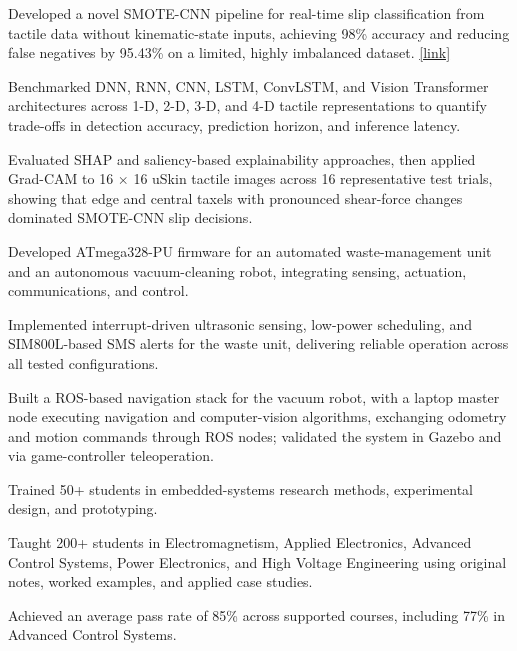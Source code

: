 \begin{details}
    \item Developed a novel SMOTE-CNN pipeline for real-time slip classification from tactile data without kinematic-state inputs, achieving 98\% accuracy and reducing false negatives by 95.43\% on a limited, highly imbalanced dataset. \href{https://github.com/nelsonifechukwu/NELSON_IML_WORK}{[link]}
    \item Benchmarked DNN, RNN, CNN, LSTM, ConvLSTM, and Vision Transformer architectures across 1-D, 2-D, 3-D, and 4-D tactile representations to quantify trade-offs in detection accuracy, prediction horizon, and inference latency.
    \item Evaluated SHAP and saliency-based explainability approaches, then applied Grad-CAM to 16 $\times$ 16 uSkin tactile images across 16 representative test trials, showing that edge and central taxels with pronounced shear-force changes dominated SMOTE-CNN slip decisions.
\end{details}

\begin{details}
    \item Developed ATmega328-PU firmware for an automated waste-management unit and an autonomous vacuum-cleaning robot, integrating sensing, actuation, communications, and control.
    \item Implemented interrupt-driven ultrasonic sensing, low-power scheduling, and SIM800L-based SMS alerts for the waste unit, delivering reliable operation across all tested configurations.
    \item Built a ROS-based navigation stack for the vacuum robot, with a laptop master node executing navigation and computer-vision algorithms, exchanging odometry and motion commands through ROS nodes; validated the system in Gazebo and via game-controller teleoperation.
    \item Trained 50+ students in embedded-systems research methods, experimental design, and prototyping.
\end{details}

\begin{details}
    \item Taught 200+ students in Electromagnetism, Applied Electronics, Advanced Control Systems, Power Electronics, and High Voltage Engineering using original notes, worked examples, and applied case studies.
    \item Achieved an average pass rate of 85\% across supported courses, including 77\% in Advanced Control Systems.
\end{details}
